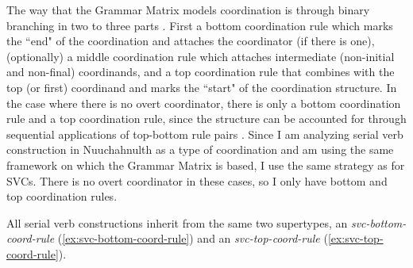 The way that the Grammar Matrix models coordination is through binary branching in two to three parts \citep{drellishakbender2005}. First a bottom coordination rule which marks the ``end" of the coordination and attaches the coordinator (if there is one), (optionally) a middle coordination rule which attaches intermediate (non-initial and non-final) coordinands, and a top coordination rule that combines with the top (or first) coordinand and marks the ``start" of the coordination structure. In the case where there is no overt coordinator, there is only a bottom coordination rule and a top coordination rule, since the structure can be accounted for through sequential applications of top-bottom rule pairs \citep[p.~9]{drellishakbender2005}. Since I am analyzing serial verb construction in Nuuchahnulth as a type of coordination and am using the same framework on which the Grammar Matrix is based, I use the same strategy as \citeauthor{drellishakbender2005} for SVCs. There is no overt coordinator in these cases, so I only have bottom and top coordination rules.

All serial verb constructions inherit from the same two supertypes, an {\textit{svc-bottom-coord-rule}} (\ref{ex:svc-bottom-coord-rule}) and an {\textit{svc-top-coord-rule}} (\ref{ex:svc-top-coord-rule}).

\begin{singlespacing}
\ex \label{ex:svc-bottom-coord-rule}
\xe
\end{singlespacing}

